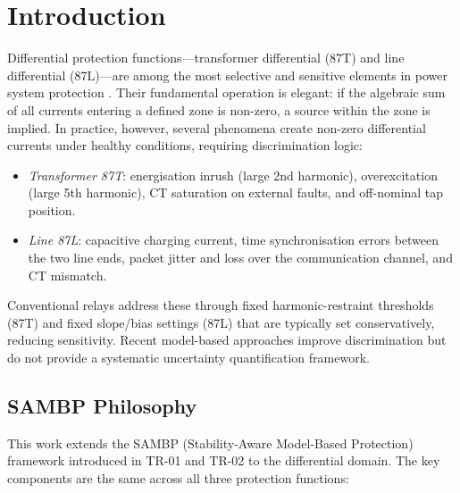 \documentclass[12pt,a4paper]{article}
\begin{document}
\section{Introduction}
\label{sec:intro}

Differential protection functions---transformer differential (87T) and line
differential (87L)---are among the most selective and sensitive elements in
power system protection \citep{Blackburn2006,Anderson1999}.  Their
fundamental operation is elegant: if the algebraic sum of all currents
entering a defined zone is non-zero, a source within the zone is implied.
In practice, however, several phenomena create non-zero differential currents
under healthy conditions, requiring discrimination logic:

\begin{itemize}
  \item \emph{Transformer 87T}: energisation inrush (large 2nd harmonic),
        overexcitation (large 5th harmonic), CT saturation on external faults,
        and off-nominal tap position.
  \item \emph{Line 87L}: capacitive charging current, time synchronisation
        errors between the two line ends, packet jitter and loss over the
        communication channel, and CT mismatch.
\end{itemize}

Conventional relays address these through fixed harmonic-restraint thresholds
(87T) and fixed slope/bias settings (87L) that are typically set conservatively,
reducing sensitivity.  Recent model-based approaches
\citep{Wiszniewski2007,Chothani2014} improve discrimination but do not
provide a systematic uncertainty quantification framework.

\subsection{SAMBP Philosophy}

This work extends the SAMBP (Stability-Aware Model-Based Protection)
framework introduced in TR-01 and TR-02 to the differential domain.  The
key components are the same across all three protection functions:
\end{document}
